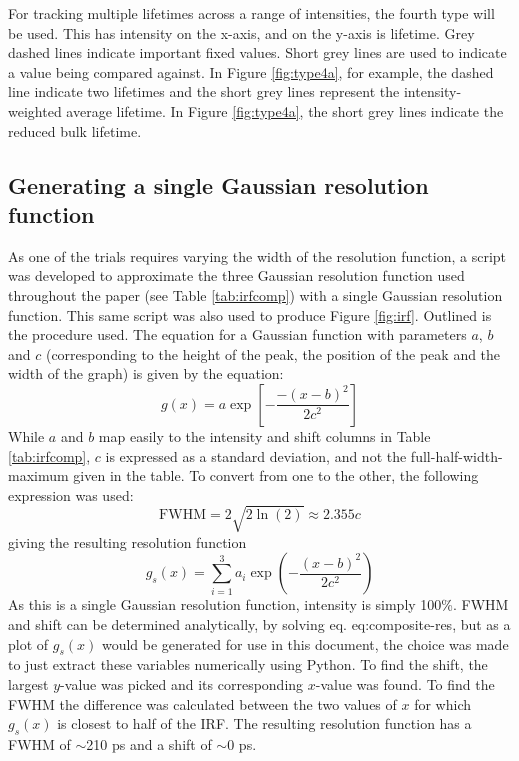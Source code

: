 For tracking multiple lifetimes across a range of intensities, the fourth type will be used. This has intensity on the x-axis, and on the y-axis is lifetime. Grey dashed lines indicate important fixed values. Short grey lines are used to indicate a value being compared against. In Figure \ref{fig:type4a}, for example, the dashed line indicate two lifetimes and the short grey lines represent the intensity-weighted average lifetime. In Figure \ref{fig:type4a}, the short grey lines indicate the reduced bulk lifetime.



\subsection{Generating a single Gaussian resolution function\label{singlegauss}}
As one of the trials requires varying the width of the resolution function, a script was developed to approximate the three Gaussian resolution function used throughout the paper (see Table \ref{tab:irfcomp}) with a single Gaussian resolution function. This same script was also used to produce Figure \ref{fig:irf}. Outlined is the procedure used.
The equation for a Gaussian function with parameters $a$, $b$ and $c$ (corresponding to the height of the peak, the position of the peak and the width of the graph) is given by the equation:
\begin{equation}
    g(x) = a\exp{\left[-\frac{-(x-b)^2}{2c^2}\right]}
\end{equation}
While $a$ and $b$ map easily to the intensity and shift columns in Table \ref{tab:irfcomp},  $c$ is expressed as a standard deviation, and not the full-half-width-maximum given in the table. To convert from one to the other, the following expression was used:
\begin{equation}
    \mathrm{FWHM} = 2\sqrt{2\ln(2)} \approx 2.355c
\end{equation}
giving the resulting resolution function
\begin{equation}
    g_s(x) = \sum_{i=1}^{3}{a_i \exp{\left(-\frac{(x-b)^2}{2c^2}\right)}}
    \label{eq:composite-res}
\end{equation}
As this is a single Gaussian resolution function, intensity is simply 100\%. FWHM and shift can be determined analytically, by solving eq. {eq:composite-res}, but as a plot of $g_s(x)$ would be generated for use in this document, the choice was made to just extract these variables numerically using Python.
To find the shift, the largest $y$-value was picked and its corresponding $x$-value was found. To find the FWHM the difference was calculated between the two values of $x$ for which $g_s(x)$ is closest to half of the IRF.
The resulting resolution function has a FWHM of $\sim$210 ps and a shift of $\sim$0 ps.


